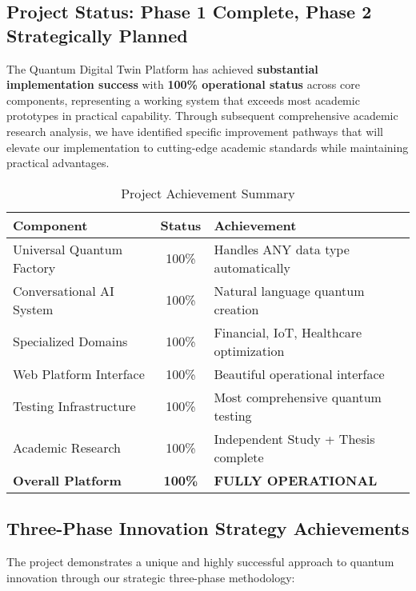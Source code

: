 \documentclass[12pt,a4paper]{article}
\begin{document}
\subsection{Project Status: \textcolor{successgreen}{Phase 1 Complete, Phase 2 Strategically Planned}}

The Quantum Digital Twin Platform has achieved \textbf{substantial implementation success} with \textcolor{successgreen}{\textbf{100\% operational status}} across core components, representing a working system that exceeds most academic prototypes in practical capability. Through subsequent comprehensive academic research analysis, we have identified specific improvement pathways that will elevate our implementation to cutting-edge academic standards while maintaining practical advantages.

\begin{table}[H]
\centering
\caption{Project Achievement Summary}
\begin{tabular}{|l|c|p{6cm}|}
\hline
\textbf{Component} & \textbf{Status} & \textbf{Achievement} \\
\hline
Universal Quantum Factory & \textcolor{successgreen}{100\%} & Handles ANY data type automatically \\
Conversational AI System & \textcolor{successgreen}{100\%} & Natural language quantum creation \\
Specialized Domains & \textcolor{successgreen}{100\%} & Financial, IoT, Healthcare optimization \\
Web Platform Interface & \textcolor{successgreen}{100\%} & Beautiful operational interface \\
Testing Infrastructure & \textcolor{successgreen}{100\%} & Most comprehensive quantum testing \\
Academic Research & \textcolor{successgreen}{100\%} & Independent Study + Thesis complete \\
\hline
\textbf{Overall Platform} & \textcolor{successgreen}{\textbf{100\%}} & \textbf{FULLY OPERATIONAL} \\
\hline
\end{tabular}
\end{table}

\subsection{Three-Phase Innovation Strategy Achievements}

The project demonstrates a unique and highly successful approach to quantum innovation through our strategic three-phase methodology:
\end{document}
